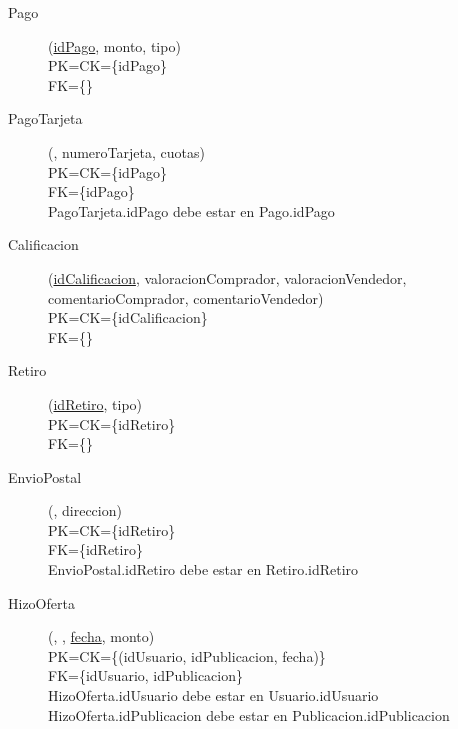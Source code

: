 \begin{description}
 \item[Pago](\underline{idPago}, monto, tipo)\\
PK=CK=\{idPago\}\\
FK=\{\}

 \item[PagoTarjeta](\underline{}, numeroTarjeta, cuotas)\\
PK=CK=\{idPago\}\\
FK=\{idPago\}\\
PagoTarjeta.idPago debe estar en Pago.idPago


 \item[Calificacion](\underline{idCalificacion}, valoracionComprador, valoracionVendedor, comentarioComprador, comentarioVendedor)\\
PK=CK=\{idCalificacion\}\\
FK=\{\}

 \item[Retiro](\underline{idRetiro}, tipo)\\
PK=CK=\{idRetiro\}\\
FK=\{\}

 \item[EnvioPostal](\underline{}, direccion)\\
PK=CK=\{idRetiro\}\\
FK=\{idRetiro\}\\
EnvioPostal.idRetiro debe estar en Retiro.idRetiro

  \item[HizoOferta](\underline{}, \underline{}, \underline{fecha}, monto)\\
PK=CK=\{(idUsuario, idPublicacion, fecha)\}\\
FK=\{idUsuario, idPublicacion\}\\
HizoOferta.idUsuario debe estar en Usuario.idUsuario\\
HizoOferta.idPublicacion debe estar en Publicacion.idPublicacion


\end{description}
